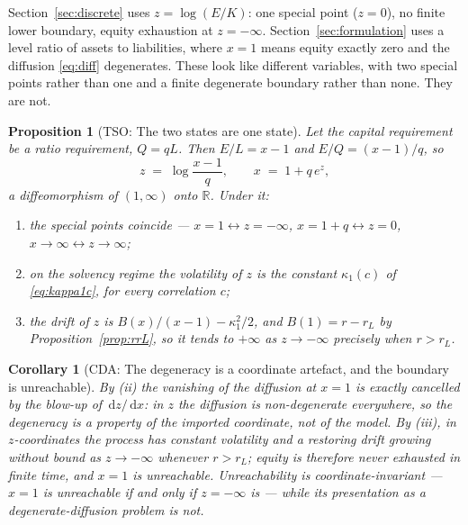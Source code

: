 \documentclass[11pt]{article}
\newtheorem{proposition}{Proposition}
\newtheorem{corollary}{Corollary}
\theoremstyle{remark}
\newcommand{\dd}{\,\mathrm{d}}
\begin{document}
Section~\ref{sec:discrete} uses $z = \log(E/K)$: one special point ($z=0$),
no finite lower boundary, equity exhaustion at $z=-\infty$.
Section~\ref{sec:formulation} uses a level ratio of assets to liabilities,
where $x=1$ means equity exactly zero and the diffusion
\eqref{eq:diff} degenerates. These look like different variables, with two
special points rather than one and a finite degenerate boundary rather
than none. They are not.

\begin{proposition}[TSO: The two states are one state]
\label{prop:statemap}
Let the capital requirement be a ratio requirement, $Q = q L$. Then
$E/L = x-1$ and $E/Q = (x-1)/q$, so
\begin{equation}
z \;=\; \log\!\frac{x-1}{q},
\qquad
x \;=\; 1 + q\,e^{z},
\label{eq:statemap}
\end{equation}
a diffeomorphism of $(1,\infty)$ onto $\mathbb{R}$. Under it:
\begin{enumerate}
\item[(i)] the special points coincide --- $x=1 \leftrightarrow
z=-\infty$, $x=1+q \leftrightarrow z=0$, $x\to\infty \leftrightarrow
z\to\infty$;
\item[(ii)] on the solvency regime the volatility of $z$ is the
\emph{constant} $\kappa_1(c)$ of \eqref{eq:kappa1c}, for every
correlation $c$;
\item[(iii)] the drift of $z$ is $B(x)/(x-1) - \kappa_1^2/2$, and
$B(1) = r-r_L$ by Proposition~\ref{prop:rrL}, so it tends to $+\infty$ as
$z\to-\infty$ precisely when $r>r_L$.
\end{enumerate}
\end{proposition}

\begin{corollary}[CDA: The degeneracy is a coordinate artefact, and the
boundary is unreachable]
\label{cor:boundary}
By (ii) the vanishing of the diffusion at $x=1$ is exactly cancelled by
the blow-up of $\dd z/\dd x$: in $z$ the diffusion is non-degenerate
everywhere, so the degeneracy is a property of the imported coordinate,
not of the model. By (iii), in $z$-coordinates the process has constant
volatility and a restoring drift growing without bound as
$z \to -\infty$ whenever $r>r_L$; equity is therefore never exhausted in
finite time, and $x=1$ is unreachable. Unreachability is
coordinate-invariant --- $x=1$ is unreachable if and only if $z=-\infty$
is --- while its presentation as a degenerate-diffusion problem is not.
\end{corollary}
\end{document}
